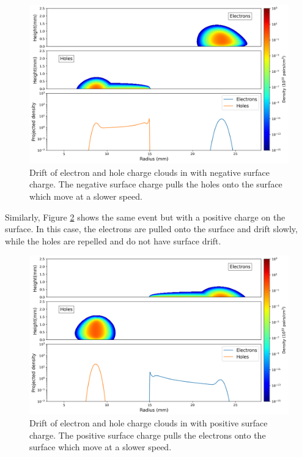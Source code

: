 \begin{figure}%
    \includegraphics[trim={0cm 0 0cm 0},clip,width=0.99\linewidth]{ch3/figs/drift_path_sc=-0.3.png}
    \caption{Drift of electron and hole charge clouds in {\ehd} with negative surface charge. The negative surface charge pulls the holes onto the surface which move at a slower speed.}
    \label{ch3_fig_ehd_path_pd_sc_neg_0p3}
\end{figure}

Similarly, Figure \ref{ch3_fig_ehd_path_pd_sc_pos_0p3} shows the same event but with a positive charge on the surface. In this case, the electrons are pulled onto the surface and drift slowly, while the holes are repelled and do not have surface drift. 

\begin{figure}%
    \includegraphics[trim={0cm 0 0cm 0},clip,width=0.99\linewidth]{ch3/figs/drift_path_sc=0.3.png}
    \caption{Drift of electron and hole charge clouds in {\ehd} with positive surface charge. The positive surface charge pulls the electrons onto the surface which move at a slower speed.}
    \label{ch3_fig_ehd_path_pd_sc_pos_0p3}
\end{figure}


